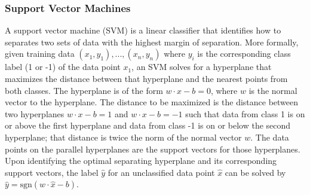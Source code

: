 \documentclass[conference,compsoc]{IEEEtran}
\begin{document}
\subsubsection{Support Vector Machines}
A support vector machine (SVM) \cite{cortes95} is a linear classifier that identifies how to separates two sets of data with the highest margin of separation. More formally, given training data $(x_1, y_1) ,...,(x_n, y_n)$ where $y_i$ is the corresponding class label (1 or -1) of the data point $x_1$, an SVM solves for a hyperplane that maximizes the distance between that hyperplane and the nearest points from both classes. The hyperplane is of the form $w \cdot x - b = 0$, where $w$ is the normal vector to the hyperplane. The distance to be maximized is the distance between two hyperplanes $w \cdot x - b = 1$ and $w \cdot x - b = -1$ such that data from class 1 is on or above the first hyperplane and data from class -1 is on or below the second hyperplane; that distance is twice the norm of the normal vector $w$. The data points on the parallel hyperplanes are the support vectors for those hyperplanes. Upon identifying the optimal separating hyperplane and its corresponding support vectors, the label $\hat{y}$ for an unclassified data point $\hat{x}$ can be solved by $\hat{y}= \text{sgn}(w \cdot \hat{x} - b)$.\\
\end{document}
